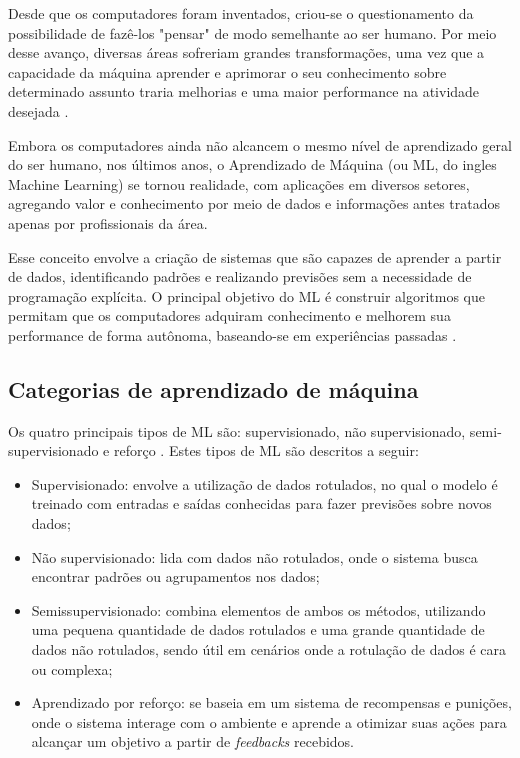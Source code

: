 Desde que os computadores foram inventados, criou-se o questionamento da possibilidade de fazê-los "pensar" de modo semelhante ao ser humano. Por meio desse avanço, diversas áreas sofreriam grandes transformações, uma vez que a capacidade da máquina aprender e aprimorar o seu conhecimento sobre determinado assunto traria melhorias e uma maior performance na atividade desejada \cite{carbonell1983}.

Embora os computadores ainda não alcancem o mesmo nível de aprendizado geral do ser humano, nos últimos anos, o Aprendizado de Máquina (ou \gls{ML}, do ingles Machine Learning) se tornou realidade, com aplicações em diversos setores, agregando valor e conhecimento por meio de dados e informações antes tratados apenas por profissionais da área.

Esse conceito envolve a criação de sistemas que são capazes de aprender a partir de dados, identificando padrões e realizando previsões sem a necessidade de programação explícita. O principal objetivo do \gls{ML} é construir algoritmos que permitam que os computadores adquiram conhecimento e melhorem sua performance de forma autônoma, baseando-se em experiências passadas \cite{carbonell1983}.

\subsection{Categorias de aprendizado de máquina}

Os quatro principais tipos de \gls{ML} são: supervisionado, não supervisionado, semi-supervisionado e reforço \cite{saravanan2018}. Estes tipos de \gls{ML} são descritos a seguir:

\begin{itemize}
    \item Supervisionado: envolve a utilização de dados rotulados, no qual o modelo é treinado com entradas e saídas conhecidas para fazer previsões sobre novos dados;
    \item Não supervisionado: lida com dados não rotulados, onde o sistema busca encontrar padrões ou agrupamentos nos dados;
    \item Semissupervisionado: combina elementos de ambos os métodos, utilizando uma pequena quantidade de dados rotulados e uma grande quantidade de dados não rotulados, sendo útil em cenários onde a rotulação de dados é cara ou complexa;
    \item Aprendizado por reforço: se baseia em um sistema de recompensas e punições, onde o sistema interage com o ambiente e aprende a otimizar suas ações para alcançar um objetivo a partir de \textit{feedbacks} recebidos.
\end{itemize}

